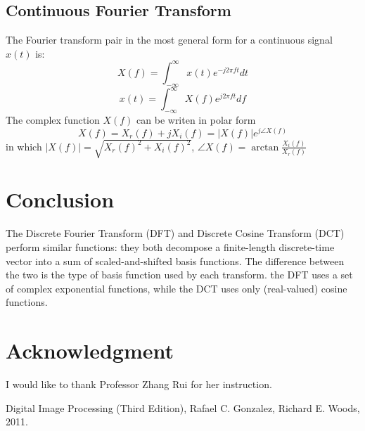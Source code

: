 \documentclass[journal,comsoc]{IEEEtran}
\begin{document}
\subsection{Continuous Fourier Transform}
\label{subsec:continuous fourier transform}
The Fourier transform pair in the most general form for a continuous signal $x(t)$ is:
\begin{equation}
  \label{cft}
  X(f)=\int_{-\infty}^{\infty}{x(t)e^{-j2\pi{ft}}dt}
\end{equation}
\begin{equation}
  \label{icft}
  x(t)=\int_{-\infty}^{\infty}X(f)e^{j2\pi{ft}}df
\end{equation}
The complex function $X(f)$ can be writen in polar form
\begin{equation}
  \label{x_f_polar}
  X(f)=X_r(f)+jX_i(f)=|X(f)|e^{j\angle{X(f)}}
\end{equation}
in which $|X(f)|=\sqrt{X_r(f)^2+X_i(f)^2}$, $\angle{X(f)}=\arctan{\frac{X_i(f)}{X_r(f)}}$


\section{Conclusion}

The Discrete Fourier Transform (DFT) and Discrete Cosine Transform (DCT) perform similar functions:
they both decompose a finite-length discrete-time vector into a sum of scaled-and-shifted basis functions.
The difference between the two is the type of basis function used by each transform. the DFT uses a set of
complex exponential functions, while the DCT uses only (real-valued) cosine functions.

\section*{Acknowledgment}
I would like to thank Professor Zhang Rui for her instruction.

\begin{thebibliography}{1}
Digital Image Processing (Third Edition), Rafael C. Gonzalez, Richard E. Woods, 2011.
\end{thebibliography}



\vfill
\end{document}
